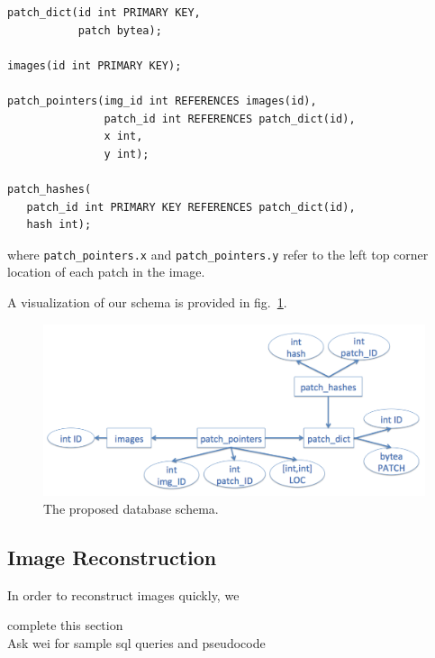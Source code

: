 \begin{verbatim}
patch_dict(id int PRIMARY KEY,
           patch bytea);

images(id int PRIMARY KEY);

patch_pointers(img_id int REFERENCES images(id),
               patch_id int REFERENCES patch_dict(id),
               x int,
               y int);

patch_hashes(
   patch_id int PRIMARY KEY REFERENCES patch_dict(id),
   hash int);
\end{verbatim}
where \texttt{patch\_pointers.x} and \texttt{patch\_pointers.y}
refer to the left top corner location of each patch in the image.

\noindent A visualization of our schema is provided in fig.~\ref{fig:schema}.

 \begin{figure}
\centering
\includegraphics[width=0.6\linewidth]{Figures/ERdiagram.png}
\caption{The proposed database schema.}
\label{fig:schema}
\end{figure}


\subsection{Image Reconstruction}\label{sec:reconst}

In order to reconstruct images quickly, we
\begin{edit}
complete this section\\
Ask wei for sample sql queries and pseudocode
\end{edit}




